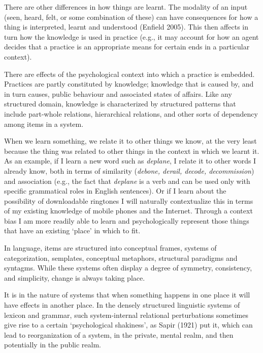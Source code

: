 There are other differences in how things are learnt. The modality of an 
input (seen, heard, felt, or some combination of these) can have 
consequences for how a thing is interpreted, learnt and understood 
(Enfield 2005). This then affects in turn how the knowledge is used in 
practice (e.g., it may account for how an agent decides that a practice 
is an appropriate means for certain ends in a particular context). 



There are effects of the psychological context into which a practice is 
embedded. Practices are partly constituted by knowledge; knowledge that 
is caused by, and in turn causes, public behaviour and associated states 
of affairs. Like any structured domain, knowledge is characterized by 
structured patterns that include part-whole relations, hierarchical 
relations, and other sorts of dependency among items in a system. 



When we learn something, we relate it to other things we know, at the 
very least because the thing was related to other things in the context 
in which we learnt it. As an example, if I learn a new word such as 
\textit{deplane}, I relate it to other words I already know, both in 
terms of similarity (\textit{debone, derail, decode, decommission}) 
and association (e.g., the fact that \textit{deplane} is a verb and 
can be used only with specific grammatical roles in English sentences). 
Or if I learn about the possibility of downloadable ringtones I will 
naturally contextualize this in terms of my existing knowledge of mobile 
phones and the Internet. Through a context bias I am more readily able 
to learn and psychologically represent those things that have an 
existing \textquoteleft place' in which to fit. 



In language, items are structured into conceptual frames, systems of 
categorization, semplates, conceptual metaphors, structural paradigms 
and syntagms. While these systems often display a degree of symmetry, 
consistency, and simplicity, change is always taking place. 



It is in the nature of systems that when something happens in one place 
it will have effects in another place. In the densely structured 
linguistic systems of lexicon and grammar, such system-internal 
relational perturbations sometimes give rise to a certain \textquoteleft psychological 
shakiness', as Sapir (1921) put it, which can lead to reorganization of 
a system, in the private, mental realm, and then potentially in the 
public realm.



